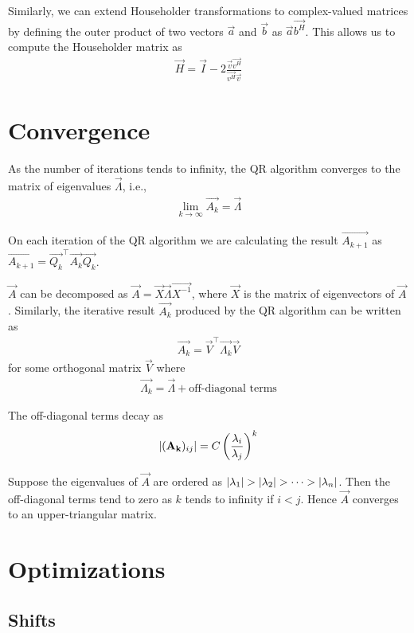 \documentclass{article}
\begin{document}
Similarly, we can extend Householder transformations to complex-valued 
matrices by defining the outer product of two vectors $\vec{a}$ and $\vec{b}$
as $\vec{a}\vec{b^H}$. This allows us to compute the Householder matrix
as
\begin{align}
    \vec{H} = \vec{I} - 2\frac{\vec{v}\vec{v^H}}{\vec{v^H}\vec{v}}
\end{align}

\section{Convergence}

As the number of iterations tends to infinity, the
QR algorithm converges to the matrix of eigenvalues $\vec{\Lambda}$, i.e.,
\begin{align}
    \lim_{k \to \infty} \vec{A_k} = \vec{\Lambda}
\end{align}

On each iteration of the QR algorithm we are calculating the result $\vec{A_{k+1}}$
as $\vec{A_{k+1}} = \vec{Q_k}^\top\vec{A_k}\vec{Q_k}$.

$\vec{A}$ can be decomposed as $\vec{A} = \vec{X}\vec{\Lambda}\vec{X^{-1}}$, where
$\vec{X}$ is the matrix of eigenvectors of $\vec{A}$. Similarly, the iterative result
$\vec{A_k}$ produced by the QR algorithm can be written as
\begin{align}
    \vec{A_k} = \vec{V}^\top\vec{\Lambda_k}\vec{V}
\end{align}
for some orthogonal matrix $\vec{V}$ where
\begin{align}
    \vec{\Lambda_k} = \vec{\Lambda} + \text{off-diagonal terms}
\end{align}

The off-diagonal terms decay as
\begin{align}
    \left\vert(\mathbf{A_k})_{ij}\right\vert = C \left(\frac{\lambda_i}{\lambda_j}\right)^k
\end{align}

Suppose the eigenvalues of $\vec{A}$ are ordered as $\left\vert\lambda_1\right\vert > \left\vert\lambda_2\right\vert > \dots > \left\vert\lambda_n\right\vert$.
Then the off-diagonal terms tend to zero as $k$ tends to infinity if $i < j$. Hence $\vec{A}$
converges to an upper-triangular matrix.

\section{Optimizations}

\subsection{Shifts}
\end{document}
